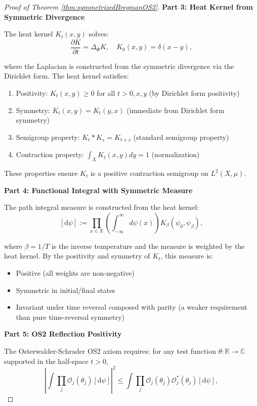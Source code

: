 \begin{lemma}
\begin{theorem}
\begin{proof}[Proof of Theorem \ref{thm:symmetrizedBregmanOS2}]
\textbf{Part 3: Heat Kernel from Symmetric Divergence}

The heat kernel $K_t(x, y)$ solves:
\begin{equation}
\frac{\partial K}{\partial t} = \Delta_\Phi K, \quad K_0(x, y) = \delta(x - y),
\end{equation}

where the Laplacian is constructed from the symmetric divergence via the Dirichlet form. The heat kernel satisfies:
\begin{enumerate}
\item Positivity: $K_t(x, y) \geq 0$ for all $t > 0, x, y$ (by Dirichlet form positivity)
\item Symmetry: $K_t(x, y) = K_t(y, x)$ (immediate from Dirichlet form symmetry)
\item Semigroup property: $K_t * K_s = K_{t+s}$ (standard semigroup property)
\item Contraction property: $\int_X K_t(x, y) dy = 1$ (normalization)
\end{enumerate}

These properties ensure $K_t$ is a positive contraction semigroup on $L^2(X, \mu)$.

\textbf{Part 4: Functional Integral with Symmetric Measure}

The path integral measure is constructed from the heat kernel:
\begin{equation}
\left[\mathrm{d}\psi\right] := \prod_{x \in X} \left(\int_{-\infty}^{\infty} d\psi(x)\right) K_{\beta}(\psi_0, \psi_\beta),
\end{equation}

where $\beta = 1/T$ is the inverse temperature and the measure is weighted by the heat kernel. By the positivity and symmetry of $K_t$, this measure is:
\begin{itemize}
\item Positive (all weights are non-negative)
\item Symmetric in initial/final states
\item Invariant under time reversal composed with parity (a weaker requirement than pure time-reversal symmetry)
\end{itemize}

\textbf{Part 5: OS2 Reflection Positivity}

The Osterwalder-Schrader OS2 axiom requires: for any test function $\theta : \mathbb{R} \to \mathbb{C}$ supported in the half-space $t > 0$,
\begin{equation}
\left|\int \prod_{j} \mathcal{O}_j(\theta_j) \left[\mathrm{d}\psi\right]\right|^2 \leq \int \prod_{j} \mathcal{O}_j(\theta_j) \mathcal{O}_j^*(\theta_j) \left[\mathrm{d}\psi\right],
\end{equation}


\end{proof}
\end{theorem}
\end{lemma}
